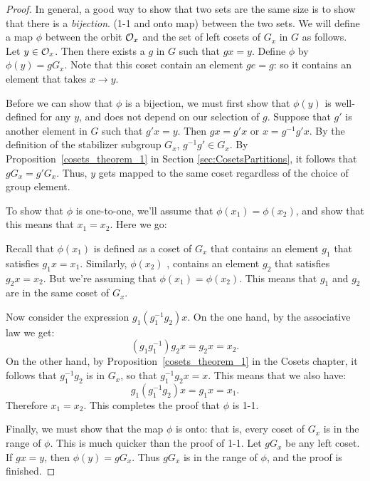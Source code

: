 \begin{proof}
In general, a good way to show that two sets are the same size is to show that there is a \emph{bijection}. (1-1 and onto map) between the two sets.  
 We will define a map $\phi$
between the orbit ${\cal O}_x$ and the set of left cosets of $G_x$ in $G$ as follows. Let $y \in {\cal O}_x$. Then there 
exists a $g$ in $G$ such that $g x = y$. Define $\phi$ by $\phi( y ) 
= g G_x$. Note that this coset contain an element $ge=g$:  so it contains an element that takes $x\rightarrow y$.  

Before we can show that $\phi$ is a bijection, we must first show that $\phi(y)$ is well-defined for any $y$, and does 
not depend on our selection of $g$. Suppose that $g'$ is another 
element in $G$ such that $g'x = y$. Then $g x = g' x$ or $x= g^{-1} g' x$. 
By the definition of the stabilizer subgroup $G_x$, $g^{-1}g'\in G_x$. By Proposition~\ref{cosets_theorem_1} in Section \ref{sec:CosetsPartitions}, it follows that 
 $g G_x = g' G_x$. Thus, $y$ gets mapped to the same 
coset regardless of the choice of group element.


To show that $\phi$ is one-to-one, we'll assume that $\phi(x_1) =
\phi(x_2)$, and show that this means that $x_1=x_2$. Here we go: 

Recall that $\phi(x_1)$ is defined as a coset of $G_x$ that contains an element $g_1$ that satisfies $g_1x=x_1.$   Similarly,  $\phi(x_2)$ , contains  an element $g_2$ that satisfies $g_2x=x_2$. But we're assuming that $\phi(x_1) =
\phi(x_2)$.  This means that $g_1$ and $g_2$ are in the same coset of $G_x$.  

Now consider the expression $g_1(g_1^{-1}g_2)x$. On the one hand, by the associative law we get:
$$(g_1g_1^{-1})g_2x=g_2x=x_2.$$ 
 On the other hand, by Proposition~\ref{cosets_theorem_1} in the Cosets chapter, it follows that $g_1^{-1}g_2$ is in $G_x$, so that $g_1^{-1}g_2x=x$.  This means that we also have:
$$g_1(g_1^{-1}g_2)x=g_1x=x_1.$$
  Therefore $x_1=x_2$.  This completes the proof that $\phi$ is 1-1.

Finally, we must show
that the map $\phi$ is onto: that is, every coset of $G_x$ is in the range of $\phi$. This is much quicker than the proof of 1-1. 
Let $g G_x$ be any  left coset. If $g x =y$, then $\phi(y) = g G_x$.  Thus $gG_x$ is in the range of $\phi$, and the proof is finished.
\end{proof}

